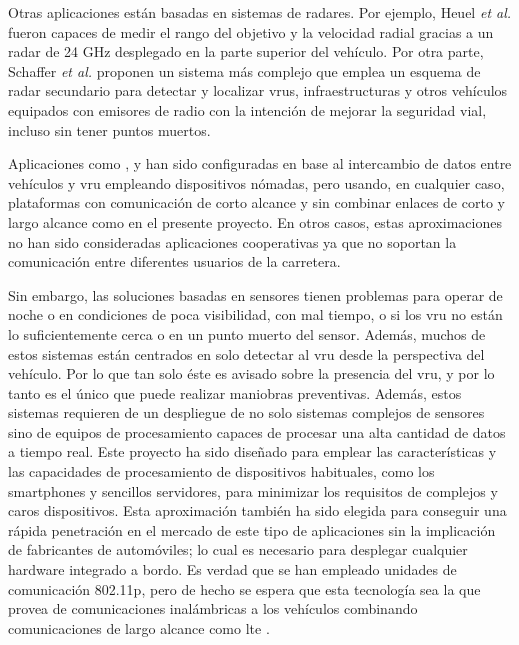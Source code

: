 Otras aplicaciones están basadas en sistemas de radares. Por ejemplo, Heuel
\emph{et al.} \cite{pedestrian_classif} fueron capaces de medir el rango del
objetivo y la velocidad radial gracias a un radar de 24 GHz desplegado en la
parte superior del vehículo. Por otra parte, Schaffer \emph{et al.}
\cite{coop_transp_sys} proponen un sistema más complejo que emplea un esquema
de radar secundario para detectar y localizar \gls{vru}s, infraestructuras y
otros vehículos equipados con emisores de radio con la intención de mejorar la
seguridad vial, incluso sin tener puntos muertos.

Aplicaciones como \cite{v2p_comm}, \cite{wifi_honk} y \cite{safety_apps} han
sido configuradas en base al intercambio de datos entre vehículos y \gls{vru}
empleando dispositivos nómadas, pero usando, en cualquier caso, plataformas con
comunicación de corto alcance y sin combinar enlaces de corto y largo alcance
como en el presente proyecto. En otros casos, estas aproximaciones no han sido
consideradas aplicaciones cooperativas ya que no soportan la comunicación entre
diferentes usuarios de la carretera.

Sin embargo, las soluciones basadas en sensores tienen problemas para operar
de noche o en condiciones de poca visibilidad, con mal tiempo, o si los
\gls{vru} no están lo suficientemente cerca o en un punto muerto del sensor.
Además, muchos de estos sistemas están centrados en solo detectar al \gls{vru}
desde la perspectiva del vehículo. Por lo que tan solo éste es avisado sobre
la presencia del \gls{vru}, y por lo tanto es el único que puede realizar
maniobras preventivas. Además, estos sistemas requieren de un despliegue de no
solo sistemas complejos de sensores sino de equipos de procesamiento capaces
de procesar una alta cantidad de datos a tiempo real. Este proyecto ha sido
diseñado para emplear las características y las capacidades de procesamiento
de dispositivos habituales, como los smartphones y sencillos servidores, para
minimizar los requisitos de complejos y caros dispositivos. Esta aproximación
también ha sido elegida para conseguir una rápida penetración en el mercado de
este tipo de aplicaciones sin la implicación de fabricantes de automóviles; lo
cual es necesario para desplegar cualquier hardware integrado a bordo. Es
verdad que se han empleado unidades de comunicación \Gls{802.11p}, pero de
hecho se espera que esta tecnología sea la que provea de comunicaciones
inalámbricas a los vehículos combinando comunicaciones de largo alcance como
\gls{lte} \cite{lte_802.11p}.
